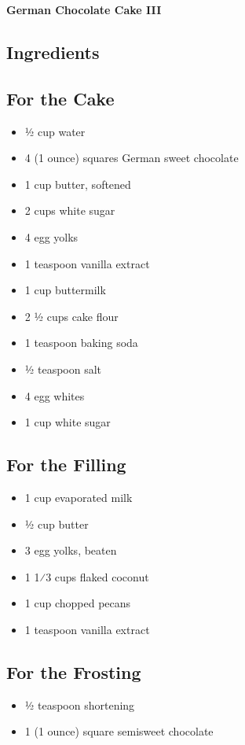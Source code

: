 \documentclass[10pt]{article}
\begin{document}
\begin{center}
{\huge \bfseries \headingfont German Chocolate Cake III}
\end{center}
\vspace{1em}
\vspace{1em}
\begin{paracol}{2}
\section*{Ingredients}
\raggedright
\subsection*{For the Cake}
\begin{itemize}[leftmargin=*]
\item 1⁄2 cup water
\item 4 (1 ounce) squares German sweet chocolate
\item 1 cup butter, softened
\item 2 cups white sugar
\item 4 egg yolks
\item 1 teaspoon vanilla extract
\item 1 cup buttermilk
\item 2 1⁄2 cups cake flour
\item 1 teaspoon baking soda
\item 1⁄2 teaspoon salt
\item 4 egg whites
\item 1 cup white sugar
\end{itemize}
\subsection*{For the Filling}
\begin{itemize}[leftmargin=*]
\item 1 cup evaporated milk
\item 1⁄2 cup butter
\item 3 egg yolks, beaten
\item 1 1⁄3 cups flaked coconut
\item 1 cup chopped pecans
\item 1 teaspoon vanilla extract
\end{itemize}
\subsection*{For the Frosting}
\begin{itemize}[leftmargin=*]
\item 1⁄2 teaspoon shortening
\item 1 (1 ounce) square semisweet chocolate
\end{itemize}
\switchcolumn

\end{paracol}
\end{document}
